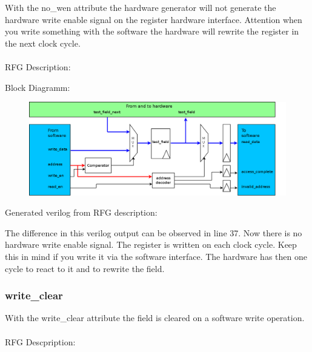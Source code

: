 \documentclass[12pt,a4paper]{article}
\begin{document}
With the no\_wen attribute the hardware generator will not generate the hardware write enable signal on the register hardware interface. Attention when you write something with the software the hardware will rewrite the register in the next clock cycle.\\
\\
RFG Description:


Block Diagramm:
\begin{figure}[h!]
\includegraphics[width=\textwidth]{pictures/Reg_hrw_srw_nhwen.png}
\end{figure}
\newpage
Generated verilog from RFG description:

The difference in this verilog output can be observed in line 37. Now there is no hardware write enable signal. The register is written on each clock cycle. Keep this in mind if you write it via the software interface. The hardware has then one cycle to react to it and to rewrite the field.
\newpage

\subsubsection{write\_clear}
With the write\_clear attribute the field is cleared on a software write operation.\\
\\
RFG Descpription:

\end{document}
